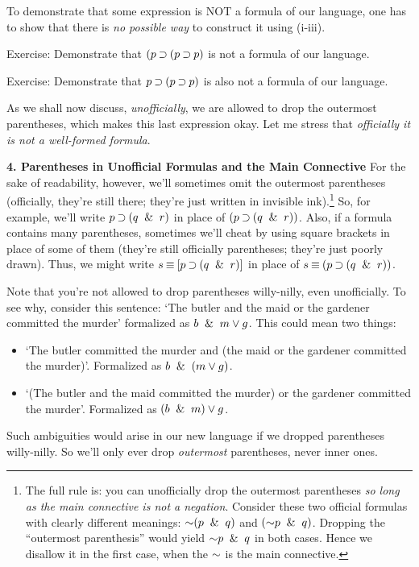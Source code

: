 \documentclass[options]{philosophersimprint}
\theoremstyle{definition}
\begin{document}
To demonstrate that some expression is NOT a formula of our language, one has to show that there is \textit{no possible way} to construct it using (i-iii).

Exercise: Demonstrate that $(p \mathbin{\supset} (p \mathbin{\supset} p)$ is not a formula of our language.

Exercise: Demonstrate that $p \mathbin{\supset} (p \mathbin{\supset} p)$ is also not a formula of our language.

As we shall now discuss, \textit{unofficially}, we are allowed to drop the outermost parentheses, which makes this last expression okay. Let me stress that \textit{officially it is not a well-formed formula}.

\textbf{4. Parentheses in Unofficial Formulas and the Main Connective} For the sake of readability, however, we'll sometimes omit the outermost parentheses (officially, they're still there; they're just written in invisible ink).\footnote{The full rule is: you can unofficially drop the outermost parentheses \textit{so long as the main connective is not a negation}. Consider these two official formulas with clearly different meanings: $\mathord{\sim}(p \ \mathbin{\&} \  q)$ and $(\mathord{\sim} p \ \mathbin{\&} \  q)$. Dropping the ``outermost parenthesis'' would yield $\mathord{\sim} p \ \mathbin{\&} \  q$ in both cases. Hence we disallow it in the first case, when the $\mathord{\sim}$ is the main connective.} So, for example, we'll write $p \mathbin{\supset} (q  \ \mathbin{\&} \  r)$ in place of $(p \mathbin{\supset} (q\ \mathbin{\&} \  r))$. Also, if a formula contains many parentheses, sometimes we'll cheat by using square brackets in place of some of them (they're still officially parentheses; they're just poorly drawn). Thus, we might write $s\mathbin{\equiv}[p \mathbin{\supset} (q \ \mathbin{\&} \  r)]$ in place of $s\mathbin{\equiv}(p \mathbin{\supset} (q\ \mathbin{\&} \  r))$.

Note that you're not allowed to drop parentheses willy-nilly, even unofficially. To see why, consider this sentence: `The butler and the maid or the gardener committed the murder' formalized as $b \ \mathbin{\&} \  m\mathbin{\vee} g$. This could mean two things:
\begin{itemize}
    \item `The butler committed the murder and (the maid or the gardener committed the murder)'. Formalized as $b \ \mathbin{\&} \  (m\mathbin{\vee} g)$.
    \item `(The butler and the maid committed the murder) or the gardener committed the murder'. Formalized as $(b \ \mathbin{\&} \  m)\mathbin{\vee} g$.
\end{itemize}
Such ambiguities would arise in our new language if we dropped parentheses willy-nilly. So we'll only ever drop \textit{outermost} parentheses, never inner ones.
\end{document}
